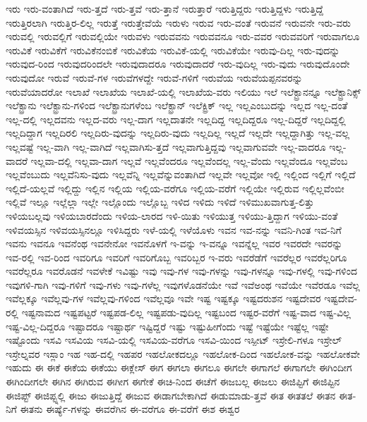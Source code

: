 {ಇರು
ಇರು-ವಂತಾಗಿದೆ
ಇರು-ತ್ತದೆ
ಇರು-ತ್ತವೆ
ಇರು-ತ್ತಾನೆ
ಇರುತ್ತಾರೆ
ಇರುತ್ತಿದ್ದರು
ಇರುತ್ತಿದ್ದಳು
ಇರುತ್ತಿದ್ದೆ
ಇರುತ್ತಿರಲಾಗಿ
ಇರುತ್ತಿರ-ಲಿಲ್ಲ
ಇರುತ್ತೆ
ಇರುತ್ತೇವೆಯೆ
ಇರುಳು
ಇರುವ
ಇರು-ವಂತೆ
ಇರುವನೆ
ಇರುವನೇ
ಇರು-ವರು
ಇರುವಲ್ಲಿ
ಇರುವಲ್ಲಿಗೆ
ಇರುವಲ್ಲಿಯೇ
ಇರುವಳು
ಇರುವವನು
ಇರುವವನೂ
ಇರು-ವವರ
ಇರುವವರಿಗೆ
ಇರುವಾಗಲೂ
ಇರುವಿಕೆ
ಇರುವಿಕೆಗೆ
ಇರುವಿಕೆನಂಬಿಕೆ
ಇರುವಿಕೆಯ
ಇರುವಿಕೆ-ಯಲ್ಲಿ
ಇರುವಿಕೆಯೇ
ಇರುವು-ದಿಲ್ಲ
ಇರು-ವುದನ್ನು
ಇರುವುದ-ರಿಂದ
ಇರುವುದರಿಂದಲೇ
ಇರುವುದಾದರೂ
ಇರುವುದಾದರೆ
ಇರು-ವುದಿಲ್ಲ
ಇರು-ವುದು
ಇರುವುದೊಂದೇ
ಇರುವುದೋ
ಇರುವೆ
ಇರುವೆ-ಗಳ
ಇರುವೆಗಳದ್ದೇ
ಇರುವೆ-ಗಳಿಗೆ
ಇರುವೆಯ
ಇರುವೆಯಪ್ಪನವರನ್ನು
ಇರುವೆಯಾದರೋ
ಇಲಾಖೆ
ಇಲಾಖೆಯ
ಇಲಾಖೆ-ಯಲ್ಲಿ
ಇಲಾಖೆಯ-ವರು
ಇಲಿಯು
ಇಲೆ
ಇಲೆಕ್ಟ್ರಾನನ್ನೂ
ಇಲೆಕ್ಟ್ರಾನಿಕ್ಸ್
ಇಲೆಕ್ಟ್ರಾನು
ಇಲೆಕ್ಟ್ರಾನು-ಗಳಿಂದ
ಇಲೆಕ್ಟ್ರಾನುಗಳೆಂಬ
ಇಲೆಕ್ಟ್ರಾನ್
ಇಲೆಕ್ಟ್ರಿಕ್
ಇಲ್ಲ
ಇಲ್ಲಎಂಬುದನ್ನು
ಇಲ್ಲದ
ಇಲ್ಲ-ದಂತೆ
ಇಲ್ಲ-ದಲ್ಲಿ
ಇಲ್ಲದವನು
ಇಲ್ಲದ-ವರು
ಇಲ್ಲ-ದಾಗ
ಇಲ್ಲದಾತನೇ
ಇಲ್ಲದಿದ್ದ
ಇಲ್ಲದಿದ್ದರೂ
ಇಲ್ಲ-ದಿದ್ದರೆ
ಇಲ್ಲದಿದ್ದಲ್ಲಿ
ಇಲ್ಲದಿದ್ದಾಗ
ಇಲ್ಲದಿರಲಿ
ಇಲ್ಲದಿರು-ವುದನ್ನು
ಇಲ್ಲದಿರು-ವುದು
ಇಲ್ಲದಿಲ್ಲ
ಇಲ್ಲದೆ
ಇಲ್ಲದೇ
ಇಲ್ಲದ್ದಾಗಿತ್ತು
ಇಲ್ಲ-ವಲ್ಲ
ಇಲ್ಲವಷ್ಟೆ
ಇಲ್ಲ-ವಾಗಿ
ಇಲ್ಲ-ವಾಗಿದೆ
ಇಲ್ಲವಾಗಿಸು-ತ್ತದೆ
ಇಲ್ಲವಾಗುತ್ತಿದ್ದವು
ಇಲ್ಲವಾಗುವವೇ
ಇಲ್ಲ-ವಾದರೂ
ಇಲ್ಲ-ವಾದರೆ
ಇಲ್ಲವಾ-ದಲ್ಲಿ
ಇಲ್ಲವಾ-ದಾಗ
ಇಲ್ಲವೆ
ಇಲ್ಲವೆಂದರೂ
ಇಲ್ಲವೆಂದಲ್ಲ
ಇಲ್ಲ-ವೆಂದು
ಇಲ್ಲವೆಂದೂ
ಇಲ್ಲವೆಂಬ
ಇಲ್ಲವೆಂಬುದು
ಇಲ್ಲವೆನಿಸು-ವುದು
ಇಲ್ಲವೆನ್ನಿ
ಇಲ್ಲವೆನ್ನುವಂತಾಗಿದೆ
ಇಲ್ಲವೇ
ಇಲ್ಲವೋ
ಇಲ್ಲಿ
ಇಲ್ಲಿಂದ
ಇಲ್ಲಿಗೆ
ಇಲ್ಲಿದೆ
ಇಲ್ಲಿದೆ-ಯಲ್ಲವೆ
ಇಲ್ಲಿದ್ದು
ಇಲ್ಲಿನ
ಇಲ್ಲಿಯ
ಇಲ್ಲಿಯ-ವರೆಗೂ
ಇಲ್ಲಿಯ-ವರೆಗೆ
ಇಲ್ಲಿಯೇ
ಇಲ್ಲಿರುವ
ಇಲ್ಲಿಲ್ಲವೆಂಬೀ
ಇಲ್ಲಿವೆ
ಇಲ್ಲೂ
ಇಲ್ಲೆಲ್ಲಾ
ಇಲ್ಲೇ
ಇಲ್ಲೊಂದು
ಇಲ್ಲೊಬ್ಬ
ಇಳಿದ
ಇಳಿದು
ಇಳಿದೆ
ಇಳಿಮುಖವಾಗುತ್ತ-ಲಿತ್ತು
ಇಳಿಯಬಲ್ಲವು
ಇಳಿಯಬಾರದೆಂದು
ಇಳಿಯ-ಲಾರದ
ಇಳಿ-ಯಿತು
ಇಳಿಯುತ್ತ
ಇಳಿಯು-ತ್ತಿದ್ದಾಗ
ಇಳಿಯು-ವಂತೆ
ಇಳಿವಯಸ್ಸಿನ
ಇಳಿವಯಸ್ಸಿನಲ್ಲೂ
ಇಳಿಸಿದ್ದರು
ಇಳೆ-ಯಲ್ಲಿ
ಇಳೆಯೊಳು
ಇವನ
ಇವ-ನನ್ನು
ಇವನಿ-ಗಿಂತ
ಇವ-ನಿಗೆ
ಇವನು
ಇವನೂ
ಇವನೆಂಥ
ಇವನೇನೋ
ಇವನೊಳಗೆ
ಇ-ವನ್ನು
ಇ-ವನ್ನೂ
ಇವನ್ನೆಲ್ಲ
ಇವರ
ಇವರದೇ
ಇವರನ್ನು
ಇವ-ರಲ್ಲಿ
ಇವ-ರಿಂದ
ಇವರಿಗೂ
ಇವರಿಗೆ
ಇವರಿಗೊಬ್ಬ
ಇವರಿಬ್ಬರ
ಇ-ವರು
ಇವರೆಡೆಗೆ
ಇವರೆಲ್ಲರ
ಇವರೆಲ್ಲರಿಗೂ
ಇವರೆಲ್ಲರೂ
ಇವರೊಡನೆ
ಇವಳೇಕೆ
ಇವಿಷ್ಟು
ಇವು
ಇವು-ಗಳ
ಇವು-ಗಳನ್ನು
ಇವು-ಗಳನ್ನೂ
ಇವು-ಗಳಲ್ಲಿ
ಇವು-ಗಳಿಂದ
ಇವುಗಳಿ-ಗಾಗಿ
ಇವು-ಗಳಿಗೆ
ಇವು-ಗಳು
ಇವು-ಗಳೆಲ್ಲ
ಇವುಗಳೊಡನೆಯೇ
ಇವೆ
ಇವೆಅಂಥ
ಇವೆಯೇ
ಇವೆರಡೂ
ಇವೆಲ್ಲ
ಇವೆಲ್ಲಕ್ಕೂ
ಇವೆಲ್ಲವು-ಗಳ
ಇವೆಲ್ಲವು-ಗಳಿಂದ
ಇವೆಲ್ಲವೂ
ಇವೇ
ಇಷ್ಟ
ಇಷ್ಟಕ್ಕೂ
ಇಷ್ಟದರುಶನ
ಇಷ್ಟದೇವರ
ಇಷ್ಟದೇವ-ರಲ್ಲಿ
ಇಷ್ಟನಾಮದ
ಇಷ್ಟಪಟ್ಟರೆ
ಇಷ್ಟಪಡ-ಲಿಲ್ಲ
ಇಷ್ಟಪಡು-ವುದಿಲ್ಲ
ಇಷ್ಟಬಂದ
ಇಷ್ಟರ-ವರೆಗೆ
ಇಷ್ಟ-ವಾದ
ಇಷ್ಟ-ವಿಲ್ಲ
ಇಷ್ಟ-ವಿಲ್ಲ-ದಿದ್ದರೂ
ಇಷ್ಟಾದರೂ
ಇಷ್ಟಾರ್ಥ
ಇಷ್ಟಿದ್ದರೆ
ಇಷ್ಟು
ಇಷ್ಟುಹೀಗೆಂದು
ಇಷ್ಟೆ
ಇಷ್ಟೆಯೇ
ಇಷ್ಟೆಲ್ಲ
ಇಷ್ಟೇ
ಇಷ್ಟೊಂದು
ಇಸವಿ
ಇಸವಿಯ
ಇಸವಿ-ಯಲ್ಲಿ
ಇಸವಿಯ-ವರೆಗೂ
ಇಸವಿ-ಯಿಂದ
ಇಸ್ಪೀಟ್
ಇಸ್ರೇಲಿ-ಗಳೂ
ಇಸ್ರೇಲ್
ಇಸ್ರೇಲ್ನವರ
ಇಸ್ಲಾಂ
ಇಹ
ಇಹ-ದಲ್ಲಿ
ಇಹಪರ
ಇಹಲೋಕದಲ್ಲೂ
ಇಹಲೋಕ-ದಿಂದ
ಇಹಲೋಕ-ವನ್ನು
ಇಹಲೋಕವೇ
ಇಹುದು
ಈ
ಈಕೆ
ಈಕೆಯ
ಈಕೆಯು
ಈಕ್ಲೇಸ್
ಈಗ
ಈಗಲಾ
ಈಗಲೂ
ಈಗಲೇ
ಈಗಾಗಲೆ
ಈಗಾಗಲೇ
ಈಗಿಂದೀಗ
ಈಗಿಂದೀಗಲೇ
ಈಗಿನ
ಈಗಿರುವ
ಈಗೀಗ
ಈಗೇಕೆ
ಈಚಿ-ನಿಂದ
ಈಚೆಗೆ
ಈಜಬಲ್ಲ
ಈಜಲು
ಈಜಿಪ್ಟಿಗೆ
ಈಜಿಪ್ಟಿನ
ಈಜಿಪ್ಟ್
ಈಜಿಪ್ಟ್ನಲ್ಲಿ
ಈಜು
ಈಜುತ್ತಿದ್ದೆ
ಈಜುವ
ಈಡಾಗಬೇಕಾಗಿದೆ
ಈಡುಮಾಡು-ತ್ತವೆ
ಈತ
ಈತತಲೆ
ಈತನ
ಈತ-ನಿಗೆ
ಈತನು
ಈರ್ಷ್ಯೆ-ಗಳನ್ನು
ಈವರೆಗಿನ
ಈ-ವರೆಗೂ
ಈ-ವರೆಗೆ
ಈಶ
ಈಶ್ವರ
}
